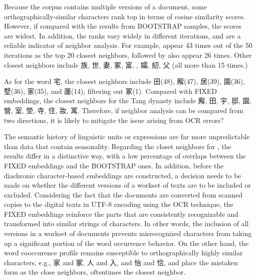 Because the corpus contains multiple versions of a document, some orthographically-similar characters rank top in terms of cosine similarity scores. However, if compared with the results from \textsc{BOOTSTRAP} samples, the scores are widest. In addition, the ranks vary widely in different iterations, and are a reliable indicator of neighbor analysis. For example,  appear 43 times out of the 50 iterations as the top 20 closest neighbors, followed by  also appear 26 times. Other closest neighbors include 族, 世, 妻, 冢, 富, , 孀, 糿, 父 (all more than 15 times.)

As for the word 宅, the closest neighbors include 田(48), 廨(47), 居(39), 園(36), 墅(36), 家(35), and 廛(14), filtering out 冢(1). Compared with \textsc{FIXED} embeddings, the closest neighbors for the Tang dynasty include 廨, 田, 宇, 邸, 園, 營, 室, 塋, 寺, 住, 妝, 寓. Therefore, if neighbor analysis can be compared from two directions, it is likely to mitigate the issue arising from OCR errors?

The semantic history of linguistic units or expressions are far more unpredictable than data that contain seasonality. Regarding the closet neighbors for \jia , the results differ in a distinctive way, with a low percentage of overlaps between the \textsc{FIXED} embeddings and the \textsc{BOOTSTRAP} ones. In addition, before the diachronic character-based embeddings are constructed, a decision needs to be made on whether the different versions of a workset of texts are to be included or excluded. Considering the fact that the documents are converted from scanned copies to the digital texts in UTF-8 encoding using the OCR technique, the \textsc{FIXED} embeddings reinforce the parts that are consistently recognizable and transformed into similar strings of characters. In other words, the inclusion of all versions in a workset of documents prevents misrecognized characters from taking up a significant portion of the word occurrence behavior. On the other hand, the word cooccurence profile remains susceptible to orthographically highly similar characters, e.g., 家 and 冢, 人 and 入, and 怡 and 恰, and place the mistaken form as the close neighbors, oftentimes the closest neighbor.

